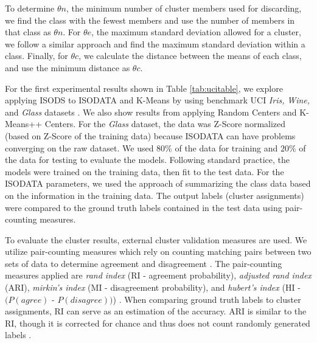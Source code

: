 \documentclass[a4paper,10pt]{article}
\begin{document}
To determine $\theta n$, the minimum number of cluster members used for
discarding, we find the class with the fewest members and use the number of
members in that class as $\theta n$. For $\theta e$, the maximum standard
deviation allowed for a cluster, we follow a similar approach and find the
maximum standard deviation within a class. Finally, for $\theta c$, we calculate
the distance between the means of each class, and use the minimum distance as
$\theta c$. 

For the first experimental results shown in Table \ref{tab:ucitable}, we explore
applying ISODS to ISODATA and K-Means by using benchmark UCI \textit{Iris,}
\textit{Wine,} and \textit{Glass} datasets \cite{Dua2019}. We also show results
from applying Random Centers and K-Means++ Centers. For the \textit{Glass}
dataset, the data was Z-Score normalized (based on Z-Score of the training data)
because ISODATA can have problems converging on the raw dataset. We used $80\%$
of the data for training and $20\%$ of the data for testing to evaluate the
models. Following standard practice, the models were trained on the training
data, then fit to the test data. For the ISODATA parameters, we used the
approach of summarizing the class data based on the information in the training
data. The output labels (cluster assignments) were compared to the ground truth
labels contained in the test data using pair-counting measures. 

To evaluate the cluster results, external cluster validation measures are used.
We utilize pair-counting measures which rely on counting matching pairs between
two sets of data to determine agreement and disagreement \cite{Rezaei2016}. The
pair-counting measures applied are \textit{rand index} (RI - agreement
probability), \textit{adjusted rand index} (ARI), \textit{mirkin's index} (MI -
disagreement probability), and \textit{hubert's index} (HI - $(P(agree)$ -
$P(disagree))$) \cite{Hubert1985, Meila2003}. When comparing ground truth labels
to cluster assignments, RI can serve as an estimation of the accuracy. ARI is
similar to the RI, though it is corrected for chance and thus does not count
randomly generated labels \cite{Rand1971}.
\end{document}
